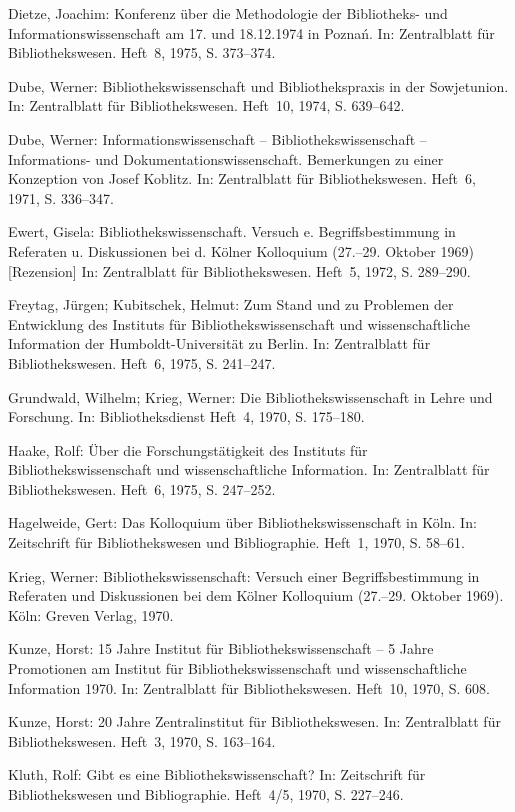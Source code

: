 \documentclass[a4paper,
fontsize=11pt,
oneside,
numbers=noperiodatend,
parskip=half-,
bibliography=totoc,
final
]{scrartcl}
\begin{document}
Dietze, Joachim: Konferenz über die Methodologie der Bibliotheks- und
Informationswissenschaft am 17. und 18.12.1974 in Poznań. In:
Zentralblatt für Bibliothekswesen. Heft~8, 1975, S. 373--374.

Dube, Werner: Bibliothekswissenschaft und Bibliothekspraxis in der
Sowjetunion. In: Zentralblatt für Bibliothekswesen. Heft~10, 1974, S. 639--642.

Dube, Werner: Informationswissenschaft -- Bibliothekswissenschaft --
Informations- und Dokumentationswissenschaft. Bemerkungen zu einer
Konzeption von Josef Koblitz. In: Zentralblatt für Bibliothekswesen.
Heft~6, 1971, S. 336--347.

Ewert, Gisela: Bibliothekswissenschaft. Versuch e. Begriffsbestimmung in
Referaten u. Diskussionen bei d. Kölner Kolloquium (27.--29. Oktober
1969) {[}Rezension{]} In: Zentralblatt für Bibliothekswesen. Heft~5,
1972, S. 289--290.

Freytag, Jürgen; Kubitschek, Helmut: Zum Stand und zu Problemen der
Entwicklung des Instituts für Bibliothekswissenschaft und
wissenschaftliche Information der Humboldt-Universität zu Berlin. In:
Zentralblatt für Bibliothekswesen. Heft~6, 1975, S. 241--247.

Grundwald, Wilhelm; Krieg, Werner: Die Bibliothekswissenschaft in Lehre
und Forschung. In: Bibliotheksdienst Heft~4, 1970, S. 175--180.

Haake, Rolf: Über die Forschungstätigkeit des Instituts für
Bibliothekswissenschaft und wissenschaftliche Information. In:
Zentralblatt für Bibliothekswesen. Heft~6, 1975, S. 247--252.

Hagelweide, Gert: Das Kolloquium über Bibliothekswissenschaft in Köln.
In: Zeitschrift für Bibliothekswesen und Bibliographie. Heft~1, 1970, S. 58--61.

Krieg, Werner: Bibliothekswissenschaft: Versuch einer Begriffsbestimmung
in Referaten und Diskussionen bei dem Kölner Kolloquium (27.--29.
Oktober 1969). Köln: Greven Verlag, 1970.

Kunze, Horst: 15 Jahre Institut für Bibliothekswissenschaft -- 5 Jahre
Promotionen am Institut für Bibliothekswissenschaft und
wissenschaftliche Information 1970. In: Zentralblatt für
Bibliothekswesen. Heft~10, 1970, S. 608.

Kunze, Horst: 20 Jahre Zentralinstitut für Bibliothekswesen. In:
Zentralblatt für Bibliothekswesen. Heft~3, 1970, S. 163--164.

Kluth, Rolf: Gibt es eine Bibliothekswissenschaft? In: Zeitschrift für
Bibliothekswesen und Bibliographie. Heft~4/5, 1970, S. 227--246.
\end{document}

